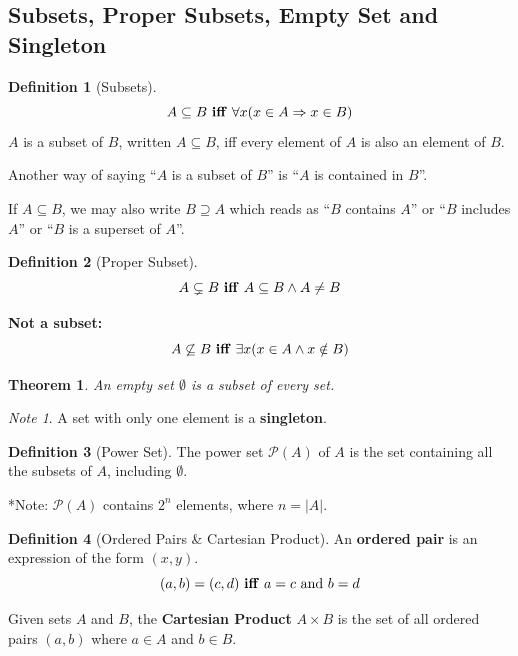 \documentclass{article}
\theoremstyle{plain}
\newtheorem{theorem}{Theorem}[section]
\theoremstyle{definition}
\newtheorem*{definition}{Definition}
\theoremstyle{remark}
\newtheorem*{note}{Note}
\begin{document}
\subsection{Subsets, Proper Subsets, Empty Set and Singleton}

\begin{definition}[Subsets]
\[A \subseteq B \text{ \textbf{iff} } \forall x (x \in A \Rightarrow x \in B)\]
$A$ is a subset of $B$, written $A \subseteq B$, iff every element of $A$ is also an element of $B$.

Another way of saying ``$A$ is a subset of $B$'' is ``$A$ is contained in $B$''.

If $A \subseteq B$, we may also write $B \supseteq A$ which reads as ``$B$ contains $A$'' or ``$B$ includes $A$'' or ``$B$ is a superset of $A$''.
\end{definition}

\begin{definition}[Proper Subset]
    \[A \subsetneq B \text{ \textbf{iff} } A \subseteq B \wedge A \neq B\]
\end{definition}

\textbf{Not a subset:}
\[A \not\subseteq B \text{ \textbf{iff} } \exists x (x \in A \wedge x \notin B)\]

\begin{theorem}
    An empty set $\emptyset$ is a subset of every set.
\end{theorem}

\begin{note}
    A set with only one element is a \textbf{singleton}.
\end{note}

\begin{definition}[Power Set]
    The power set $\mathcal{P}(A)$ of $A$ is the set containing all the subsets of $A$, including $\emptyset$.
    
    *Note: $\mathcal{P}(A)$ contains $2^n$ elements, where $n = |A|$.
\end{definition}

\begin{definition}[Ordered Pairs \& Cartesian Product]
    An \textbf{ordered pair} is an expression of the form $(x,y)$.
    \[(a,b) = (c,d) \text{ \textbf{iff} } a=c \text{ and } b=d\]
    
    Given sets $A$ and $B$, the \textbf{Cartesian Product} $A \times B$ is the set of all ordered pairs $(a, b)$ where $a \in A$ and $b \in B$.
\end{definition}
\end{document}
